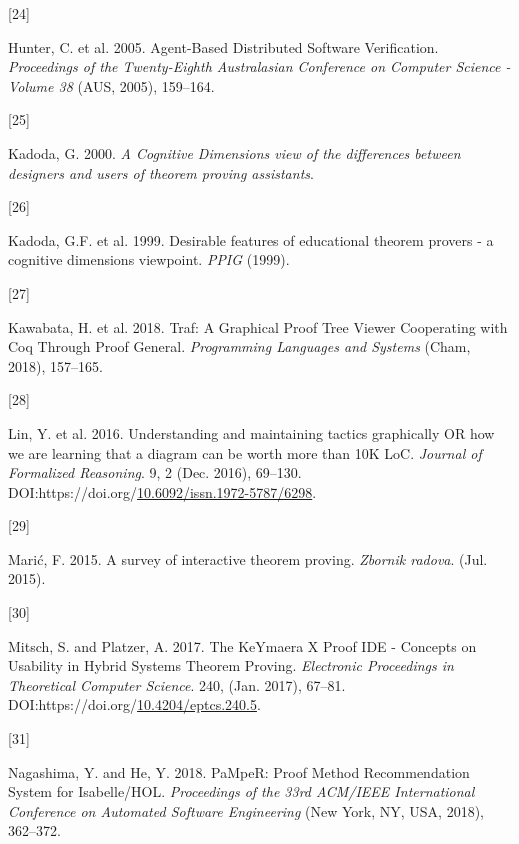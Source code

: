 \documentclass[
]{article}
\newlength{\cslhangindent}
\newlength{\csllabelwidth}
\newlength{\cslentryspacingunit} %
\newenvironment{CSLReferences}[2] %
 {%
  \setlength{\parindent}{0pt}
  \ifodd #1
  \let\oldpar\par
  \def\par{\hangindent=\cslhangindent\oldpar}
  \fi
  \setlength{\parskip}{#2\cslentryspacingunit}
 }%
 {}
\newcommand{\CSLLeftMargin}[1]{\parbox[t]{\csllabelwidth}{#1}}
\newcommand{\CSLRightInline}[1]{\parbox[t]{\linewidth - \csllabelwidth}{#1}\break}
\begin{document}
\begin{CSLReferences}{0}{0}
\leavevmode{}%
\CSLLeftMargin{{[}24{]} }
\CSLRightInline{Hunter, C. et al. 2005. Agent-{Based} {Distributed}
{Software} {Verification}. \emph{Proceedings of the {Twenty}-{Eighth}
{Australasian} {Conference} on {Computer} {Science} - {Volume} 38} (AUS,
2005), 159--164.}

\leavevmode{}%
\CSLLeftMargin{{[}25{]} }
\CSLRightInline{Kadoda, G. 2000. \emph{A {Cognitive} {Dimensions} view
of the differences between designers and users of theorem proving
assistants}.}

\leavevmode{}%
\CSLLeftMargin{{[}26{]} }
\CSLRightInline{Kadoda, G.F. et al. 1999. Desirable features of
educational theorem provers - a cognitive dimensions viewpoint.
\emph{{PPIG}} (1999).}

\leavevmode{}%
\CSLLeftMargin{{[}27{]} }
\CSLRightInline{Kawabata, H. et al. 2018. Traf: {A} {Graphical} {Proof}
{Tree} {Viewer} {Cooperating} with {Coq} {Through} {Proof} {General}.
\emph{Programming {Languages} and {Systems}} (Cham, 2018), 157--165.}

\leavevmode{}%
\CSLLeftMargin{{[}28{]} }
\CSLRightInline{Lin, Y. et al. 2016. Understanding and maintaining
tactics graphically {OR} how we are learning that a diagram can be worth
more than {10K} {LoC}. \emph{Journal of Formalized Reasoning}. 9, 2
(Dec. 2016), 69--130.
DOI:https://doi.org/\href{https://doi.org/10.6092/issn.1972-5787/6298}{10.6092/issn.1972-5787/6298}.}

\leavevmode{}%
\CSLLeftMargin{{[}29{]} }
\CSLRightInline{Marić, F. 2015. A survey of interactive theorem proving.
\emph{Zbornik radova}. (Jul. 2015).}

\leavevmode{}%
\CSLLeftMargin{{[}30{]} }
\CSLRightInline{Mitsch, S. and Platzer, A. 2017. The {KeYmaera} {X}
{Proof} {IDE} - {Concepts} on {Usability} in {Hybrid} {Systems}
{Theorem} {Proving}. \emph{Electronic Proceedings in Theoretical
Computer Science}. 240, (Jan. 2017), 67--81.
DOI:https://doi.org/\href{https://doi.org/10.4204/eptcs.240.5}{10.4204/eptcs.240.5}.}

\leavevmode{}%
\CSLLeftMargin{{[}31{]} }
\CSLRightInline{Nagashima, Y. and He, Y. 2018. {PaMpeR}: {Proof}
{Method} {Recommendation} {System} for {Isabelle}/{HOL}.
\emph{Proceedings of the 33rd {ACM}/{IEEE} {International} {Conference}
on {Automated} {Software} {Engineering}} (New York, NY, USA, 2018),
362--372.}


\end{CSLReferences}
\end{document}
